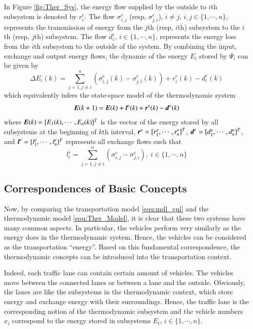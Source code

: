\documentclass[preprint,authoryear,12pt]{elsarticle}
\renewcommand{\vec}[1]{\mbox{\boldmath$#1$}}
\begin{document}
In Figure \ref{fig:Ther_Sys}, the energy flow supplied by the outside
to $i$th subsystem is denoted by $r^e_i$. The flow $\sigma^e_{i,j}$
(resp, $\sigma^e_{j,i}$), $i\neq j$, $i,j\in \{1,\cdots,n\}$,
represents the transmission of energy from the $j$th (resp, $i$th)
subsystem to the $i$th (resp, $j$th) subsystem. The flow $d^e_i$,
$i\in \{1,\cdots,n\}$, represents the energy loss from the $i$th
subsystem to the outside of the system. By combining the input,
exchange and output energy flows, the dynamic of the energy $E_i$
stored by $\Psi_i$ can be given by
\begin{equation}\label{equ:Ther_Model_SubSystem}
\Delta E_i(k) = \sum_{j=1,j\neq
i}^{n}(\sigma^e_{i,j}(k)-\sigma^e_{j,i}(k))+r^e_i(k)-d^e_i(k)
\end{equation}
which equivalently infers the state-space model of the thermodynamic
system
\begin{equation}\label{equ:Ther_Model}
    \vec{E}(k+1)=\vec{E}(k)+\vec{l}^e(k)+\vec{r}^e(k)-\vec{d}^e(k)
\end{equation}
where $\vec{E}(k)=[E_1(k),\cdots,E_n(k)]^T$ is the vector of the
energy stored by all subsystems at the beginning of $k$th interval,
$\vec{r}^e=[r^e_1,\cdots,r^e_n]^T$,
$\vec{d}^e=[d^e_{1},\cdots,d^e_{n}]^T$, and
$\vec{l}^e=[l^e_1,\cdots,l^e_n]^T$ represents all exchange flows such
that
\begin{equation*}
l^e_i = \sum_{j=1,j\neq i}^{n}
        (\sigma^e_{i,j}-\sigma^e_{j,i}),
\; i\in \{1,\cdots,n\}
\end{equation*}

\subsection{Correspondences of Basic Concepts}

Now, by comparing the transportation model \eqref{equ:mdl_gnl} and
the thermodynamic model \eqref{equ:Ther_Model}, it is clear that
these two systems have many common aspects. In particular, the
vehicles perform very similarly as the energy does in the
thermodynamic system. Hence, the vehicles can be considered as the
transportation ``energy''. Based on this fundamental correspondence,
the thermodynamic concepts can be introduced into the transportation
context.

Indeed, each traffic lane can contain certain amount of vehicles. The
vehicles move between the connected lanes or between a lane and the
outside. Obviously, the lanes are like the subsystems in the
thermodynamic context, which store energy and exchange energy with
their surroundings. Hence, the traffic lane is the corresponding
notion of the thermodynamic subsystem and the vehicle numbers $x_i$
correspond to the energy stored in subsystems $E_i$,
$i\in\{1,\cdots,n\}$.
\end{document}
